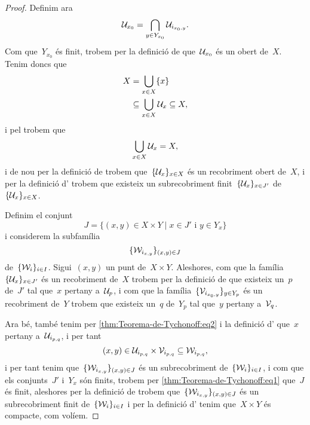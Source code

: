 \documentclass[../../main.tex]{subfiles}
\begin{document}
\begin{proof}
        Definim ara
        \begin{equation}
            \label{thm:Teorema-de-Tychonoff:eq2}
            \mathcal{U}_{x_{0}}=\bigcap_{y\in Y_{x_{0}}}\mathcal{U}_{i_{x_{0},y}}.
        \end{equation}
        Com que~\(Y_{x_{0}}\) és finit, trobem per la definició de  que~\(\mathcal{U}_{x_{0}}\) és un obert de~\(X\).
        Tenim doncs que
        \begin{align*}
            X&=\bigcup_{x\in X}\{x\} \\
            &\subseteq\bigcup_{x\in X}\mathcal{U}_{x}\subseteq X,
        \end{align*}
        i pel  trobem que
        \[
            \bigcup_{x\in X}\mathcal{U}_{x}=X,
        \]
        i de nou per la definició de  trobem que~\(\{\mathcal{U}_{x}\}_{x\in X}\) és un recobriment obert de~\(X\), i per la definició d' trobem que existeix un subrecobriment finit~\(\{\mathcal{U}_{x}\}_{x\in J'}\) de~\(\{\mathcal{U}_{x}\}_{x\in X}\).

        Definim el conjunt
        \begin{equation}
            \label{thm:Teorema-de-Tychonoff:eq1}
            J=\{(x,y)\in X\times Y\mid x\in J'\text{ i }y\in Y_{x}\}
        \end{equation}
        i considerem la subfamília
        \[
            \{\mathcal{W}_{i_{x,y}}\}_{(x,y)\in J}
        \]
        de~\(\{\mathcal{W}_{i}\}_{i\in I}\).
        Sigui~\((x,y)\) un punt de~\(X\times Y\).
        Aleshores, com que la família~\(\{\mathcal{U}_{x}\}_{x\in J'}\) és un recobriment de~\(X\) trobem per la definició de  que existeix un~\(p\) de~\(J'\) tal que~\(x\) pertany a~\(\mathcal{U}_{p}\), i com que la família~\(\{\mathcal{V}_{i_{x_{0},y}}\}_{y\in Y_{p}}\) és un recobriment de~\(Y\) trobem que existeix un~\(q\) de~\(Y_{p}\) tal que~\(y\) pertany a~\(\mathcal{V}_{q}\).

        Ara bé, també tenim per \eqref{thm:Teorema-de-Tychonoff:eq2} i la definició d' que~\(x\) pertany a~\(\mathcal{U}_{i_{p,q}}\), i per tant
        \[
            (x,y)\in\mathcal{U}_{i_{p,q}}\times\mathcal{V}_{i_{p,q}}\subseteq\mathcal{W}_{i_{p,q}},
        \]
        i per tant tenim que~\(\{\mathcal{W}_{i_{x,y}}\}_{(x,y)\in J}\) és un subrecobriment de~\(\{\mathcal{W}_{i}\}_{i\in I}\), i com que els conjunts~\(J'\) i~\(Y_{x}\) són finits, trobem per \eqref{thm:Teorema-de-Tychonoff:eq1} que~\(J\) és finit, aleshores per la definició de  trobem que~\(\{\mathcal{W}_{i_{x,y}}\}_{(x,y)\in J}\) és un subrecobriment finit de~\(\{\mathcal{W}_{i}\}_{i\in I}\) i per la definició d' tenim que~\(X\times Y\) és compacte, com volíem.
    \end{proof}
\end{document}
